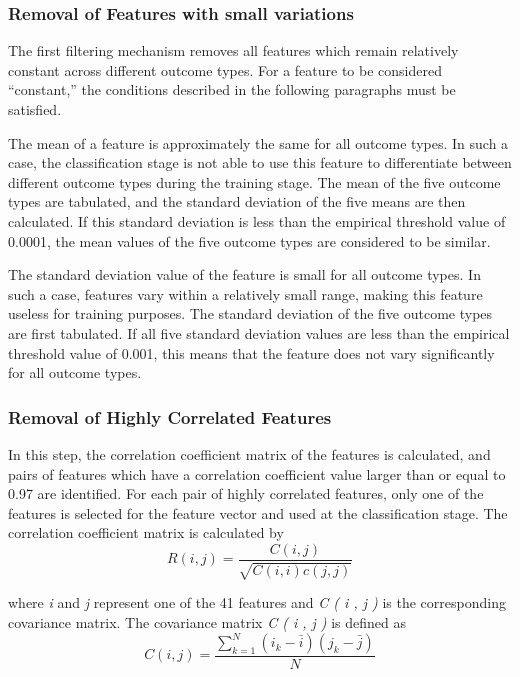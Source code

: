 \documentclass[12pt]{article}
\theoremstyle{definition}
\begin{document}
			\subsubsection{Removal of Features with small variations}
			The first filtering mechanism removes all features which remain relatively constant across different outcome types. For a feature to be considered “constant,” the conditions described in the following paragraphs must be satisfied.
			
			The mean of a feature is approximately the same for all outcome types. In such a case, the classification stage is not able to use this feature to differentiate between different outcome types during the training stage. The mean of the five outcome types are tabulated, and the standard deviation of the five means are then calculated. If this
			standard deviation is less than the empirical threshold value of 0.0001, the mean values of the five outcome types are considered to be similar.
			
			The standard deviation value of the feature is small for all outcome types. In such a case, features vary within a relatively small range, making this feature useless for training purposes. The standard deviation of the five outcome types are first tabulated. If all five standard deviation values are less than the empirical threshold value of 0.001, this means that the feature does not vary significantly for all outcome types.
			\subsubsection{Removal of Highly Correlated Features}
			In this step, the correlation coefficient matrix of the features is calculated, and pairs of features which have a correlation coefficient value larger than or equal to 0.97 are identified. For each pair of highly correlated features, only one of the features is selected for the feature vector and used at the classification stage. The correlation coefficient matrix is calculated by
			\begin{equation}
			R(i,j) = \frac{C(i, j)}{\sqrt{C(i, i) c(j,j)}}
			\end{equation}
			
			where \emph{i} and \emph{j} represent one of the 41 features and \emph{C ( i , j )} is the corresponding covariance matrix. The covariance matrix \emph{C ( i , j )} is defined as
			\begin{equation}
				C(i,j) = \frac{\sum_{k=1}^{N}(i_{k}-\bar{i})(j_{k} - \bar{j})}{N}
			\end{equation}
			
\end{document}

